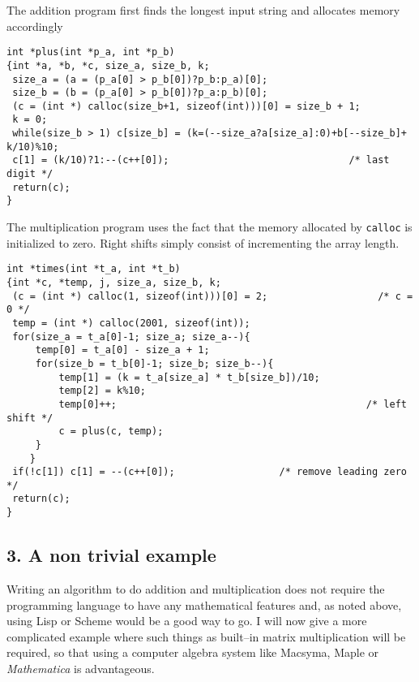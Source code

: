 \noindent
The addition program first finds the longest input string and allocates
memory accordingly

\begin{boxedtext}
\noindent
{\small
\begin{verbatim}
int *plus(int *p_a, int *p_b) 
{int *a, *b, *c, size_a, size_b, k;
 size_a = (a = (p_a[0] > p_b[0])?p_b:p_a)[0]; 
 size_b = (b = (p_a[0] > p_b[0])?p_a:p_b)[0];
 (c = (int *) calloc(size_b+1, sizeof(int)))[0] = size_b + 1;
 k = 0;
 while(size_b > 1) c[size_b] = (k=(--size_a?a[size_a]:0)+b[--size_b]+ k/10)%10;
 c[1] = (k/10)?1:--(c++[0]);                               /* last digit */  
 return(c); 
}
\end{verbatim}
}
\end{boxedtext}

\noindent
The multiplication program uses the fact that the memory allocated by
{\tt calloc} is initialized to zero. Right shifts simply consist of
incrementing the array length.

\begin{boxedtext}
\noindent
{\small
\begin{verbatim}
int *times(int *t_a, int *t_b) 
{int *c, *temp, j, size_a, size_b, k; 
 (c = (int *) calloc(1, sizeof(int)))[0] = 2;                   /* c = 0 */
 temp = (int *) calloc(2001, sizeof(int));  
 for(size_a = t_a[0]-1; size_a; size_a--){
     temp[0] = t_a[0] - size_a + 1;
     for(size_b = t_b[0]-1; size_b; size_b--){
         temp[1] = (k = t_a[size_a] * t_b[size_b])/10;
         temp[2] = k%10;        
         temp[0]++;                                           /* left shift */ 
         c = plus(c, temp);
     }
    }
 if(!c[1]) c[1] = --(c++[0]);                  /* remove leading zero */
 return(c);
}
\end{verbatim}
}
\end{boxedtext}

\subsection*{3. A non trivial example}

Writing an algorithm to do addition and multiplication does not
require the programming language to have any mathematical features and,
as noted above, using Lisp or Scheme would be a good way to go.  I
will now give a more complicated example where such things as
built--in matrix multiplication will be required, so that using a
computer algebra system like Macsyma, Maple or {\sl Mathematica\/}  
is advantageous.

